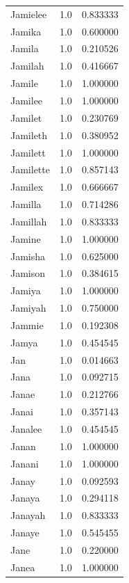 \documentclass[
  letterpaper,
  DIV=11,
  numbers=noendperiod]{scrreprt}
\begin{document}
\begin{tabular}{lrr}
Jamielee        &   1.0 &   0.833333 \\
Jamika          &   1.0 &   0.600000 \\
Jamila          &   1.0 &   0.210526 \\
Jamilah         &   1.0 &   0.416667 \\
Jamile          &   1.0 &   1.000000 \\
Jamilee         &   1.0 &   1.000000 \\
Jamilet         &   1.0 &   0.230769 \\
Jamileth        &   1.0 &   0.380952 \\
Jamilett        &   1.0 &   1.000000 \\
Jamilette       &   1.0 &   0.857143 \\
Jamilex         &   1.0 &   0.666667 \\
Jamilla         &   1.0 &   0.714286 \\
Jamillah        &   1.0 &   0.833333 \\
Jamine          &   1.0 &   1.000000 \\
Jamisha         &   1.0 &   0.625000 \\
Jamison         &   1.0 &   0.384615 \\
Jamiya          &   1.0 &   1.000000 \\
Jamiyah         &   1.0 &   0.750000 \\
Jammie          &   1.0 &   0.192308 \\
Jamya           &   1.0 &   0.454545 \\
Jan             &   1.0 &   0.014663 \\
Jana            &   1.0 &   0.092715 \\
Janae           &   1.0 &   0.212766 \\
Janai           &   1.0 &   0.357143 \\
Janalee         &   1.0 &   0.454545 \\
Janan           &   1.0 &   1.000000 \\
Janani          &   1.0 &   1.000000 \\
Janay           &   1.0 &   0.092593 \\
Janaya          &   1.0 &   0.294118 \\
Janayah         &   1.0 &   0.833333 \\
Janaye          &   1.0 &   0.545455 \\
Jane            &   1.0 &   0.220000 \\
Janea           &   1.0 &   1.000000 \\

\end{tabular}
\end{document}
